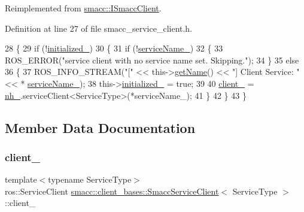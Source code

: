 Reimplemented from \hyperlink{classsmacc_1_1ISmaccClient_a974ebb6ad6cf812e7b9de6b78b3d901f}{smacc\+::\+I\+Smacc\+Client}.



Definition at line 27 of file smacc\+\_\+service\+\_\+client.\+h.


\begin{DoxyCode}
28     \{
29         \textcolor{keywordflow}{if} (!\hyperlink{classsmacc_1_1client__bases_1_1SmaccServiceClient_ad36816c62fc14380a6d0782a2592a5b4}{initialized\_})
30         \{
31             \textcolor{keywordflow}{if} (!\hyperlink{classsmacc_1_1client__bases_1_1SmaccServiceClient_a63732ec406cb8b6f65bbdbb73e01c7ab}{serviceName\_})
32             \{
33                 ROS\_ERROR(\textcolor{stringliteral}{"service client with no service name set. Skipping."});
34             \}
35             \textcolor{keywordflow}{else}
36             \{
37                 ROS\_INFO\_STREAM(\textcolor{stringliteral}{"["} << this->\hyperlink{classsmacc_1_1ISmaccClient_a8c3ce19f182e71909c5dc6263d25be69}{getName}() << \textcolor{stringliteral}{"] Client Service: "} << *
      \hyperlink{classsmacc_1_1client__bases_1_1SmaccServiceClient_a63732ec406cb8b6f65bbdbb73e01c7ab}{serviceName\_});
38                 this->\hyperlink{classsmacc_1_1client__bases_1_1SmaccServiceClient_ad36816c62fc14380a6d0782a2592a5b4}{initialized\_} = \textcolor{keyword}{true};
39 
40                 \hyperlink{classsmacc_1_1client__bases_1_1SmaccServiceClient_a632093eb6bc8b058dec492b21c8536f9}{client\_} = \hyperlink{classsmacc_1_1client__bases_1_1SmaccServiceClient_afb62982383b8269c7962cd1588537489}{nh\_}.serviceClient<ServiceType>(*serviceName\_);
41             \}
42         \}
43     \}
\end{DoxyCode}


\subsection{Member Data Documentation}
\mbox{\label{classsmacc_1_1client__bases_1_1SmaccServiceClient_a632093eb6bc8b058dec492b21c8536f9}} 
\subsubsection{\texorpdfstring{client\+\_\+}{client\_}}
{\footnotesize\ttfamily template$<$typename Service\+Type$>$ \\
ros\+::\+Service\+Client \hyperlink{classsmacc_1_1client__bases_1_1SmaccServiceClient}{smacc\+::client\+\_\+bases\+::\+Smacc\+Service\+Client}$<$ Service\+Type $>$\+::client\+\_\+\hspace{0.3cm}{\ttfamily [protected]}}



